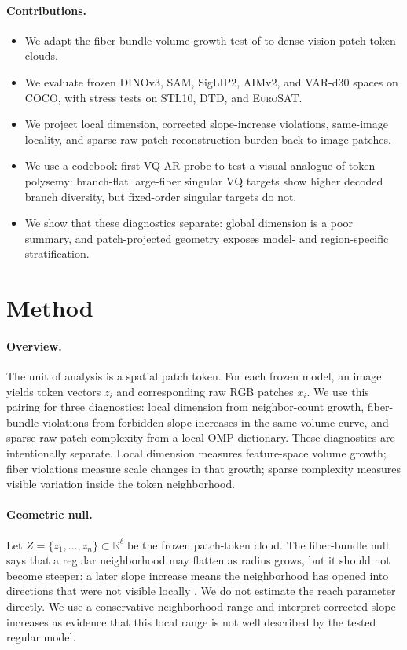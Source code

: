 \documentclass{article}
\newcommand{\dataset}[1]{\textsc{#1}}
\newcommand{\R}{\mathbb{R}}
\begin{document}
\paragraph{Contributions.}
\begin{itemize}[leftmargin=1.5em]
\item We adapt the fiber-bundle volume-growth test of \citet{robinson2025token} to dense vision patch-token clouds.
\item We evaluate frozen DINOv3, SAM, SigLIP2, AIMv2, and VAR-d30 spaces on \dataset{COCO}, with stress tests on \dataset{STL10}, \dataset{DTD}, and \dataset{EuroSAT}.
\item We project local dimension, corrected slope-increase violations, same-image locality, and sparse raw-patch reconstruction burden back to image patches.
\item We use a codebook-first VQ-AR probe to test a visual analogue of token polysemy: branch-flat large-fiber singular VQ targets show higher decoded branch diversity, but fixed-order singular targets do not.
\item We show that these diagnostics separate: global dimension is a poor summary, and patch-projected geometry exposes model- and region-specific stratification.
\end{itemize}

\section{Method}
\paragraph{Overview.}
The unit of analysis is a spatial patch token. For each frozen model, an image yields token vectors $z_i$ and corresponding raw RGB patches $x_i$. We use this pairing for three diagnostics: local dimension from neighbor-count growth, fiber-bundle violations from forbidden slope increases in the same volume curve, and sparse raw-patch complexity from a local OMP dictionary. These diagnostics are intentionally separate. Local dimension measures feature-space volume growth; fiber violations measure scale changes in that growth; sparse complexity measures visible variation inside the token neighborhood.

\paragraph{Geometric null.}
Let $Z=\{z_1,\ldots,z_n\}\subset \R^\ell$ be the frozen patch-token cloud. The fiber-bundle null says that a regular neighborhood may flatten as radius grows, but it should not become steeper: a later slope increase means the neighborhood has opened into directions that were not visible locally \citep{robinson2025token}. We do not estimate the reach parameter directly. We use a conservative neighborhood range and interpret corrected slope increases as evidence that this local range is not well described by the tested regular model.
\end{document}
